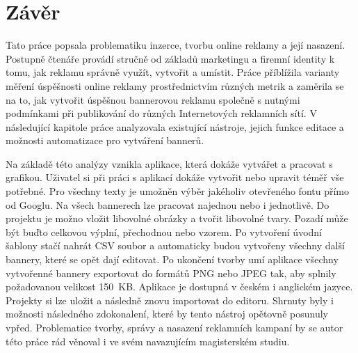 \chapter{Závěr}
\label{chap:conclusion}
Tato práce popsala problematiku inzerce, tvorbu online reklamy a její nasazení. Postupně čtenáře provádí stručně od základů marketingu a firemní identity k tomu, jak
reklamu správně využít, vytvořit a umístit. Práce příblížila varianty měření úspěšnosti online reklamy prostřednictvím různých metrik a zaměrila se na to, jak vytvořit úspěšnou bannerovou reklamu
společně s nutnými podmínkami při publikování do různých Internetových reklamních sítí. 
V následující kapitole práce analyzovala existující nástroje, jejich funkce editace a možnosti automatizace pro vytváření bannerů.

Na základě této analýzy vznikla aplikace, která dokáže vytvářet a pracovat s grafikou. Uživatel si při práci s aplikací dokáže vytvořit nebo upravit téměř vše potřebné.
Pro všechny texty je umožněn výběr jakéholiv otevřeného fontu přímo od Googlu. Na všech bannerech lze pracovat najednou nebo i jednotlivě. Do projektu je možno vložit
libovolné obrázky a tvořit libovolné tvary. Pozadí může být buďto celkovou výplní, přechodnou nebo vzorem. Po vytvoření úvodní šablony stačí nahrát 
CSV soubor a automaticky budou vytvořeny všechny další bannery, které se opět dají editovat. Po ukončení tvorby umí aplikace všechny vytvořenné bannery exportovat do formátů PNG nebo JPEG tak,
aby splnily požadovanou velikost 150~KB. Aplikace je dostupná v českém i anglickém jazyce. Projekty si lze uložit a následně znovu importovat do editoru.
Shrnuty byly i možnosti následného zdokonalení, které by tento nástroj opětovně posunuly vpřed. Problematice tvorby, správy a nasazení reklamních kampaní
by se autor této práce rád věnoval i ve svém navazujícím magisterském studiu. 


\endinput